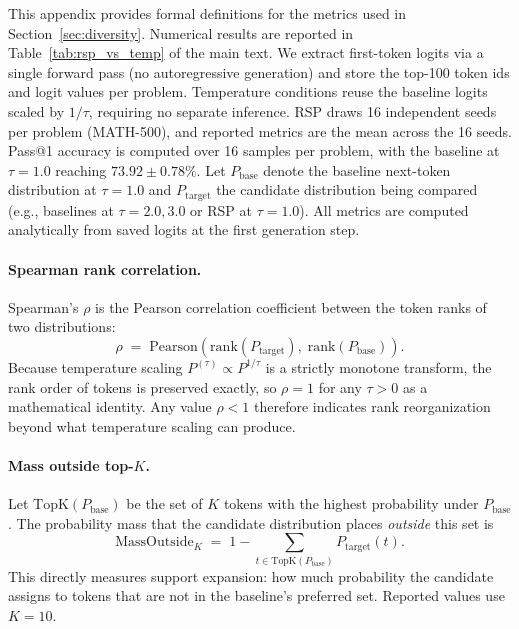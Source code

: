 This appendix provides formal definitions for the metrics used in Section~\ref{sec:diversity}. Numerical results are reported in Table~\ref{tab:rsp_vs_temp} of the main text. We extract first-token logits via a single forward pass (no autoregressive generation) and store the top-100 token ids and logit values per problem. Temperature conditions reuse the baseline logits scaled by $1/\tau$, requiring no separate inference. RSP draws 16 independent seeds per problem (MATH-500), and reported metrics are the mean across the 16 seeds. Pass@1 accuracy is computed over 16 samples per problem, with the baseline at $\tau{=}1.0$ reaching $73.92 \pm 0.78\%$. Let $P_{\text{base}}$ denote the baseline next-token distribution at $\tau{=}1.0$ and $P_{\text{target}}$ the candidate distribution being compared (e.g., baselines at $\tau{=}2.0, 3.0$ or RSP at $\tau{=}1.0$). All metrics are computed analytically from saved logits at the first generation step.

\paragraph{Spearman rank correlation.}
Spearman's $\rho$ is the Pearson correlation coefficient between the token ranks of two distributions:
\begin{equation}
\rho \;=\; \mathrm{Pearson}\!\left(\mathrm{rank}(P_{\text{target}}),\; \mathrm{rank}(P_{\text{base}})\right).
\end{equation}
Because temperature scaling $P^{(\tau)} \propto P^{1/\tau}$ is a strictly monotone transform, the rank order of tokens is preserved exactly, so $\rho = 1$ for any $\tau > 0$ as a mathematical identity. Any value $\rho < 1$ therefore indicates rank reorganization beyond what temperature scaling can produce.

\paragraph{Mass outside top-$K$.}
Let $\mathrm{TopK}(P_{\text{base}})$ be the set of $K$ tokens with the highest probability under $P_{\text{base}}$. The probability mass that the candidate distribution places \emph{outside} this set is
\begin{equation}
\mathrm{MassOutside}_K \;=\; 1 - \sum_{t \in \mathrm{TopK}(P_{\text{base}})} P_{\text{target}}(t).
\end{equation}
This directly measures support expansion: how much probability the candidate assigns to tokens that are not in the baseline's preferred set. Reported values use $K = 10$.

